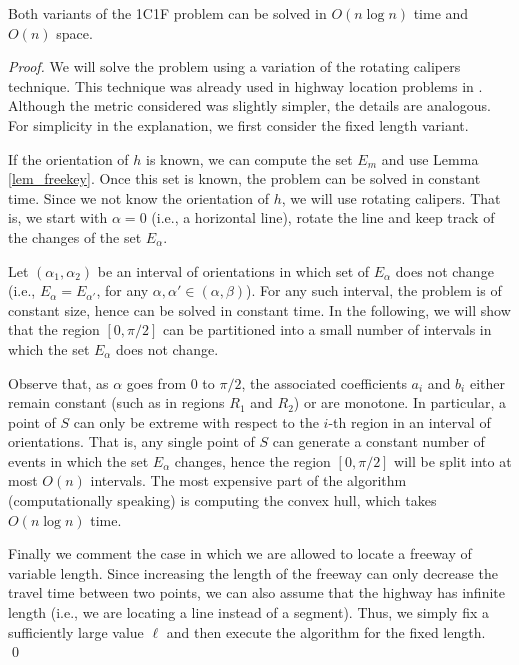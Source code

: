 \documentclass{llncs}
\begin{document}
\begin{theorem}\label{theo_FL1C1F}
Both variants of the 1C1F problem can be solved in $O(n\log n)$ time and $O(n)$ space.
\end{theorem}
\begin{proof}
We will solve the problem using a variation of the rotating calipers technique. This technique was already used in highway location problems in \cite{ahn09}. Although the metric considered was slightly simpler, the details are analogous. For simplicity in the explanation, we first consider the fixed length variant.

If the orientation of $h$ is known, we can compute the set $E_m$ and use Lemma \ref{lem_freekey}. Once this set is known, the problem can be solved in constant time. Since we not know the orientation of $h$, we will use rotating calipers. That is, we start with ${\alpha}=0$ (i.e., a horizontal line), rotate the line and keep track of the changes of the set $E_{\alpha}$.

Let $(\alpha_1,\alpha_2)$ be an interval of orientations in which set of $E_{\alpha}$ does not change (i.e., $E_{\alpha}=E_{\alpha'}$, for any ${\alpha},{\alpha'}\in(\alpha,\beta)$). For any such interval, the problem is of constant size, hence can be solved in constant time. In the following, we will show that the region $[0,\pi/2]$ can be partitioned into a small number of intervals in which the set $E_{\alpha}$ does not change.

Observe that, as ${\alpha}$ goes from $0$ to $\pi/2$, the associated coefficients $a_i$ and $b_i$ either remain constant (such as in regions $R_1$ and $R_2$) or are monotone. In particular, a point of $S$ can only be extreme with respect to the $i$-th region in an interval of orientations. That is, any single point of $S$ can generate a constant number of events in which the set $E_{\alpha}$ changes, hence the region $[0,\pi/2]$ will be split into at most $O(n)$ intervals. The most expensive part of the algorithm  (computationally speaking) is computing the convex hull, which takes $O(n\log n)$ time.

Finally we comment the case in which we are allowed to locate a freeway of variable length. Since increasing the length of the freeway can only decrease the travel time between two points, we can also assume that the highway has infinite length (i.e., we are locating a line instead of a segment). Thus, we simply fix a sufficiently large value $\ell$ and then execute the algorithm for the fixed length. \qed
\end{proof}
\end{document}
